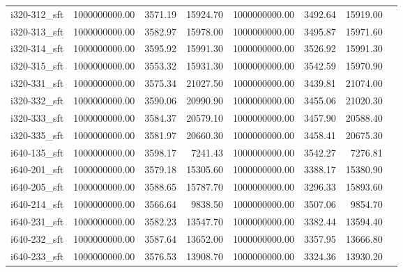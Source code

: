 \begin{tabular}{llrrrrrr}
i320-312\_sft &      1000000000.00 &                3571.19 &         15924.70 &    1000000000.00 &              3492.64 &       15919.00 \\
i320-313\_sft &      1000000000.00 &                3582.97 &         15978.00 &    1000000000.00 &              3495.87 &       15971.60 \\
i320-314\_sft &      1000000000.00 &                3595.92 &         15991.30 &    1000000000.00 &              3526.92 &       15991.30 \\
i320-315\_sft &      1000000000.00 &                3553.32 &         15931.30 &    1000000000.00 &              3542.59 &       15970.90 \\
i320-331\_sft &      1000000000.00 &                3575.34 &         21027.50 &    1000000000.00 &              3439.81 &       21074.00 \\
i320-332\_sft &      1000000000.00 &                3590.06 &         20990.90 &    1000000000.00 &              3455.06 &       21020.30 \\
i320-333\_sft &      1000000000.00 &                3584.37 &         20579.10 &    1000000000.00 &              3457.90 &       20588.40 \\
i320-335\_sft &      1000000000.00 &                3581.97 &         20660.30 &    1000000000.00 &              3458.41 &       20675.30 \\
i640-135\_sft &      1000000000.00 &                3598.17 &          7241.43 &    1000000000.00 &              3542.27 &        7276.81 \\
i640-201\_sft &      1000000000.00 &                3579.18 &         15305.60 &    1000000000.00 &              3388.17 &       15380.90 \\
i640-205\_sft &      1000000000.00 &                3588.65 &         15787.70 &    1000000000.00 &              3296.33 &       15893.60 \\
i640-214\_sft &      1000000000.00 &                3566.64 &          9838.50 &    1000000000.00 &              3507.06 &        9854.70 \\
i640-231\_sft &      1000000000.00 &                3582.23 &         13547.70 &    1000000000.00 &              3382.44 &       13594.40 \\
i640-232\_sft &      1000000000.00 &                3587.64 &         13652.00 &    1000000000.00 &              3357.95 &       13666.80 \\
i640-233\_sft &      1000000000.00 &                3576.53 &         13908.70 &    1000000000.00 &              3324.36 &       13930.20 \\

\end{tabular}
